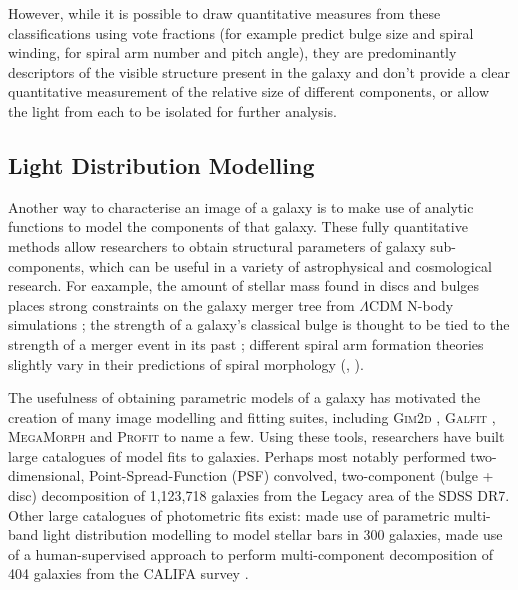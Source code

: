 \documentclass[../main.tex]{subfiles}
\begin{document}
However, while it is possible to draw quantitative measures from these classifications using vote fractions (for example \citealt{Masters2019:1904.11436v1} predict bulge size and spiral winding, \citealt{2017MNRAS.472.2263H} for spiral arm number and pitch angle), they are predominantly descriptors of the visible structure present in the galaxy and don't provide a clear quantitative measurement of the relative size of different components, or allow the light from each to be isolated for further analysis.

\subsection{Light Distribution Modelling}

Another way to characterise an image of a galaxy is to make use of analytic functions to model the components of that galaxy. These fully quantitative methods allow researchers to obtain structural parameters of galaxy sub-components, which can be useful in a variety of astrophysical and cosmological research. For eaxample, the amount of stellar mass found in discs and bulges places strong constraints on the galaxy merger tree from $\Lambda\mathrm{CDM}$ N-body simulations \citep{Hopkins2010:1004.2708v3}; the strength of a galaxy's classical bulge is thought to be tied to the strength of a merger event in its past \citep{Kormendy2010:1009.3015v1}; different spiral arm formation theories slightly vary in their predictions of spiral morphology (\citealt{Dobbs2014:1407.5062v1}, \citealt{Pour-Imani2016:1608.00969v1} \citealt{2017MNRAS.472.2263H}).

The usefulness of obtaining parametric models of a galaxy has motivated the creation of many image modelling and fitting suites, including \textsc{Gim2d} \citep{gim2d-paper}, \textsc{Galfit} \citep{galfit-paper}, \textsc{MegaMorph} \citep{megamorph-paper} and \textsc{Profit} \citep{profit-paper} to name a few. Using these tools, researchers have built large catalogues of model fits to galaxies. Perhaps most notably \citet{Simard2002:astro-ph/0205025v2} performed two-dimensional, Point-Spread-Function (PSF) convolved, two-component (bulge + disc) decomposition of 1,123,718 galaxies from the Legacy area of the SDSS DR7. Other large catalogues of photometric fits exist: \cite{Gadotti2010:1003.1719v2} made use of parametric multi-band light distribution modelling to model stellar bars in 300 galaxies, \cite{Mendez-Abreu2016:1610.05324v1} made use of a human-supervised approach to perform multi-component decomposition of 404 galaxies from the CALIFA survey \citep{Sanchez2011:1111.0962v2}.
\end{document}
